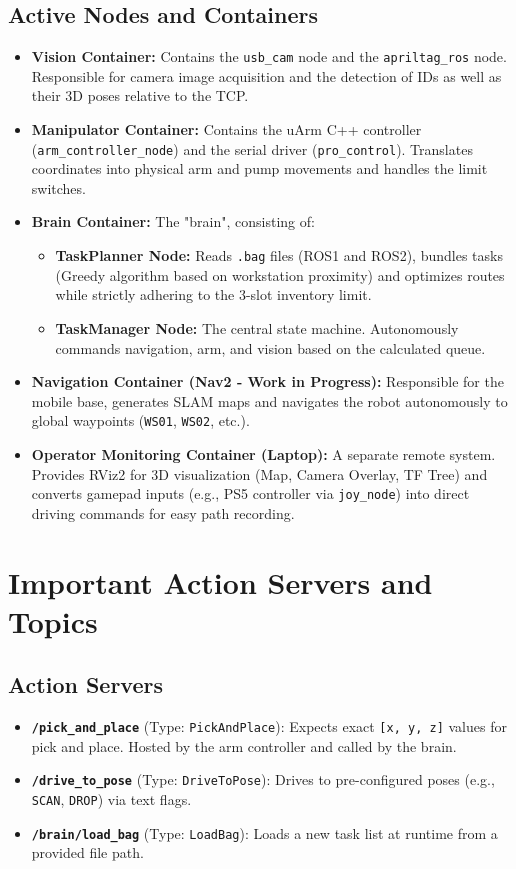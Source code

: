 \documentclass[12pt,a4paper]{article}
\begin{document}
\subsection{Active Nodes and Containers}
\begin{itemize}
    \item \textbf{Vision Container:} Contains the \texttt{usb\_cam} node and the \texttt{apriltag\_ros} node. Responsible for camera image acquisition and the detection of IDs as well as their 3D poses relative to the TCP.
    \item \textbf{Manipulator Container:} Contains the uArm C++ controller (\texttt{arm\_controller\_node}) and the serial driver (\texttt{pro\_control}). Translates coordinates into physical arm and pump movements and handles the limit switches.
    \item \textbf{Brain Container:} The "brain", consisting of:
    \begin{itemize}
        \item \textbf{TaskPlanner Node:} Reads \texttt{.bag} files (ROS1 and ROS2), bundles tasks (Greedy algorithm based on workstation proximity) and optimizes routes while strictly adhering to the 3-slot inventory limit.
        \item \textbf{TaskManager Node:} The central state machine. Autonomously commands navigation, arm, and vision based on the calculated queue.
    \end{itemize}
    \item \textbf{Navigation Container (Nav2 - Work in Progress):} Responsible for the mobile base, generates SLAM maps and navigates the robot autonomously to global waypoints (\texttt{WS01}, \texttt{WS02}, etc.).
    \item \textbf{Operator Monitoring Container (Laptop):} A separate remote system. Provides RViz2 for 3D visualization (Map, Camera Overlay, TF Tree) and converts gamepad inputs (e.g., PS5 controller via \texttt{joy\_node}) into direct driving commands for easy path recording.
\end{itemize}

\section{Important Action Servers and Topics}
\subsection{Action Servers}
\begin{itemize}
    \item \textbf{\texttt{/pick\_and\_place}} (Type: \texttt{PickAndPlace}): Expects exact \texttt{[x, y, z]} values for pick and place. Hosted by the arm controller and called by the brain.
    \item \textbf{\texttt{/drive\_to\_pose}} (Type: \texttt{DriveToPose}): Drives to pre-configured poses (e.g., \texttt{SCAN}, \texttt{DROP}) via text flags.
    \item \textbf{\texttt{/brain/load\_bag}} (Type: \texttt{LoadBag}): Loads a new task list at runtime from a provided file path.
\end{itemize}
\end{document}
